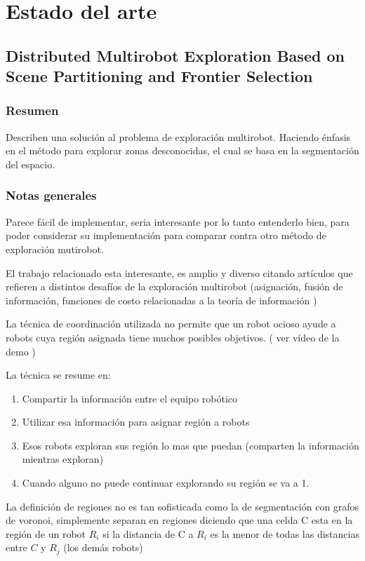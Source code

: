 \section{Estado del arte}

\subsection{Distributed Multirobot Exploration Based on Scene Partitioning and Frontier Selection}

\subsubsection{Resumen}
Describen una solución al problema de exploración multirobot. Haciendo énfasis en el método para explorar zonas desconocidas, el cual se basa en la segmentación del espacio.

\subsubsection{Notas generales}
Parece fácil de implementar, seria interesante por lo tanto entenderlo bien, para poder considerar su implementación para comparar contra otro método de exploración mutirobot.

El trabajo relacionado esta interesante, es amplio y diverso citando artículos que refieren a distintos desafíos de la exploración multirobot (asignación, fusión de información, funciones de costo relacionadas a la teoría de información )

La técnica de coordinación utilizada no permite que un robot ocioso ayude a robots cuya región asignada tiene muchos posibles objetivos. ( ver vídeo de la demo )

La técnica se resume en:
\begin{enumerate}
  \item Compartir la información entre el equipo robótico
  \item Utilizar esa información para asignar región a robots
  \item Esos robots exploran sus región lo mas que puedan (comparten la información mientras exploran)
  \item Cuando alguno no puede continuar explorando su región se va a 1.
\end{enumerate}

La definición de regiones no es tan sofisticada como la de segmentación con grafos de voronoi, simplemente separan en regiones diciendo que una celda C esta en la región de un robot $R_i$ si la distancia de C a $R_i$ es la menor de todas las distancias entre $C$ y $R_j$ (los demás robots)

